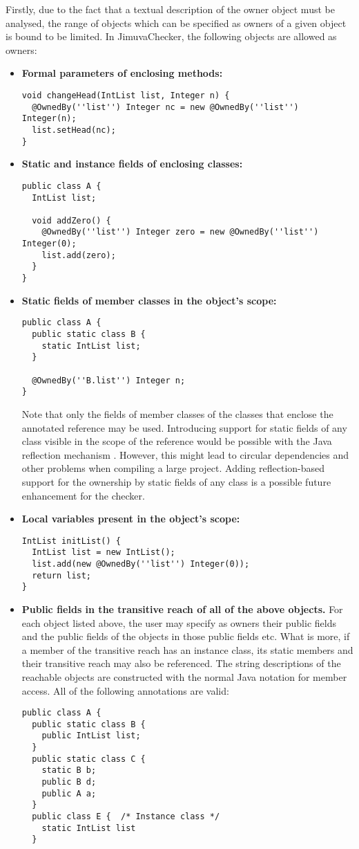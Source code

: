 \documentclass{pracamgr}
\theoremstyle{all}
\begin{document}
Firstly, due to the fact that a textual description of the owner
object must be analysed, the range of objects which can be specified
as owners of a given object is bound to be limited. In JimuvaChecker,
the following objects are allowed as owners:
\begin{itemize}
\item \textbf{Formal parameters of enclosing methods:}
  \begin{lstlisting}
void changeHead(IntList list, Integer n) {
  @OwnedBy(''list'') Integer nc = new @OwnedBy(''list'') Integer(n);
  list.setHead(nc);
}
  \end{lstlisting}
\item \textbf{Static and instance fields of enclosing classes:}
  \begin{lstlisting}
public class A {
  IntList list;

  void addZero() {
    @OwnedBy(''list'') Integer zero = new @OwnedBy(''list'') Integer(0);
    list.add(zero);
  }
}
\end{lstlisting}
\item \textbf{Static fields of member classes in the object's scope:}
  \begin{lstlisting}
public class A {
  public static class B {
    static IntList list;
  }

  @OwnedBy(''B.list'') Integer n;
}
\end{lstlisting}
Note that only the fields of member classes of the classes that
enclose the annotated reference may be used. Introducing support for
static fields of any class visible in the scope of the reference would
be possible with the Java reflection mechanism
\cite{reflection}. However, this might lead to circular dependencies
and other problems when compiling a large project. Adding
reflection-based support for the ownership by static fields of any
class is a possible future enhancement for the checker.
\item \textbf{Local variables present in the object's scope:}
\begin{lstlisting}
IntList initList() {
  IntList list = new IntList();
  list.add(new @OwnedBy(''list'') Integer(0)); 
  return list;
}
\end{lstlisting}
\item \textbf{Public fields in the transitive reach of all of the
    above objects.} For each object listed above, the user may specify
  as owners their public fields and the public fields of the objects
  in those public fields etc. What is more, if a member of the
  transitive reach has an instance class, its static members and their
  transitive reach may also be referenced. The string descriptions of
  the reachable objects are constructed with the normal Java notation
  for member access. All of the following annotations are valid:
  \begin{lstlisting}
public class A {
  public static class B {
    public IntList list;
  }
  public static class C {
    static B b;
    public B d;
    public A a;
  }
  public class E {  /* Instance class */
    static IntList list
  }
  

\end{lstlisting}
\end{itemize}
\end{document}
